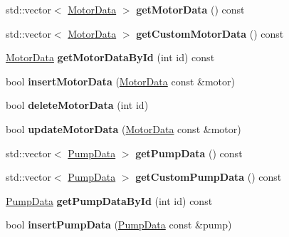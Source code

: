 \begin{DoxyCompactItemize}
std\+::vector$<$ \hyperlink{class_motor_data}{Motor\+Data} $>$ {\bfseries get\+Motor\+Data} () const
\item 
\mbox{\label{class_s_q_lite_a40f0107a78cdb8d735242d954da87ac7}} 
std\+::vector$<$ \hyperlink{class_motor_data}{Motor\+Data} $>$ {\bfseries get\+Custom\+Motor\+Data} () const
\item 
\mbox{\label{class_s_q_lite_a4b0a99992e2909216b40dc499c86a028}} 
\hyperlink{class_motor_data}{Motor\+Data} {\bfseries get\+Motor\+Data\+By\+Id} (int id) const
\item 
\mbox{\label{class_s_q_lite_a38eb0f1501e0918c267a9ab3a0953a54}} 
bool {\bfseries insert\+Motor\+Data} (\hyperlink{class_motor_data}{Motor\+Data} const \&motor)
\item 
\mbox{\label{class_s_q_lite_ab1f59cd24e3931970bc39079b0a5e612}} 
bool {\bfseries delete\+Motor\+Data} (int id)
\item 
\mbox{\label{class_s_q_lite_a7909128eed1b0612ecdf7c50edf1426a}} 
bool {\bfseries update\+Motor\+Data} (\hyperlink{class_motor_data}{Motor\+Data} const \&motor)
\item 
\mbox{\label{class_s_q_lite_ad203543a646b1171cb8e680c295976eb}} 
std\+::vector$<$ \hyperlink{class_pump_data}{Pump\+Data} $>$ {\bfseries get\+Pump\+Data} () const
\item 
\mbox{\label{class_s_q_lite_abcbdd4e6b7ddedd91fd6dcaa62b97696}} 
std\+::vector$<$ \hyperlink{class_pump_data}{Pump\+Data} $>$ {\bfseries get\+Custom\+Pump\+Data} () const
\item 
\mbox{\label{class_s_q_lite_a3ef7e31ae397704e54802d441ee93ef4}} 
\hyperlink{class_pump_data}{Pump\+Data} {\bfseries get\+Pump\+Data\+By\+Id} (int id) const
\item 
\mbox{\label{class_s_q_lite_a88f4b584c569fbab361b9ee1418117a8}} 
bool {\bfseries insert\+Pump\+Data} (\hyperlink{class_pump_data}{Pump\+Data} const \&pump)
\item 
\mbox{\label{class_s_q_lite_a1efbc9694699b16250b8510791bfc2db}} 

\end{DoxyCompactItemize}
